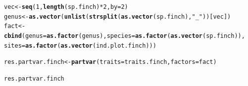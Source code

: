 \documentclass[12pt]{article}\usepackage[]{graphicx}\usepackage[]{color}
\makeatletter
\newcommand{\hlnum}[1]{\textcolor[rgb]{0.686,0.059,0.569}{#1}}%
\newcommand{\hlstr}[1]{\textcolor[rgb]{0.192,0.494,0.8}{#1}}%
\newcommand{\hlopt}[1]{\textcolor[rgb]{0,0,0}{#1}}%
\newcommand{\hlstd}[1]{\textcolor[rgb]{0.345,0.345,0.345}{#1}}%
\newcommand{\hlkwb}[1]{\textcolor[rgb]{0.69,0.353,0.396}{#1}}%
\newcommand{\hlkwc}[1]{\textcolor[rgb]{0.333,0.667,0.333}{#1}}%
\newcommand{\hlkwd}[1]{\textcolor[rgb]{0.737,0.353,0.396}{\textbf{#1}}}%
\newenvironment{kframe}{%
 \def\at@end@of@kframe{}%
 \ifinner\ifhmode%
  \def\at@end@of@kframe{\end{minipage}}%
  \begin{minipage}{\columnwidth}%
 \fi\fi%
 \def\FrameCommand##1{\hskip\@totalleftmargin \hskip-\fboxsep
 \colorbox{shadecolor}{##1}\hskip-\fboxsep
     \hskip-\linewidth \hskip-\@totalleftmargin \hskip\columnwidth}%
 \MakeFramed {\advance\hsize-\width
   \@totalleftmargin\z@ \linewidth\hsize
   \@setminipage}}%
 {\par\unskip\endMakeFramed%
 \at@end@of@kframe}
\newenvironment{knitrout}{}{} %
\makeatother
\begin{document}
\begin{knitrout}
\color{fgcolor}\begin{kframe}
\begin{alltt}
\hlstd{vec} \hlkwb{<-} \hlkwd{seq}\hlstd{(}\hlnum{1}\hlstd{,} \hlkwd{length}\hlstd{(sp.finch)} \hlopt{*} \hlnum{2}\hlstd{,} \hlkwc{by} \hlstd{=} \hlnum{2}\hlstd{)}
\hlstd{genus} \hlkwb{<-} \hlkwd{as.vector}\hlstd{(}\hlkwd{unlist}\hlstd{(}\hlkwd{strsplit}\hlstd{(}\hlkwd{as.vector}\hlstd{(sp.finch),} \hlstr{"_"}\hlstd{))[vec])}
\hlstd{fact} \hlkwb{<-} \hlkwd{cbind}\hlstd{(}\hlkwc{genus} \hlstd{=} \hlkwd{as.factor}\hlstd{(genus),} \hlkwc{species} \hlstd{=} \hlkwd{as.factor}\hlstd{(}\hlkwd{as.vector}\hlstd{(sp.finch)),}
    \hlkwc{sites} \hlstd{=} \hlkwd{as.factor}\hlstd{(}\hlkwd{as.vector}\hlstd{(ind.plot.finch)))}

\hlstd{res.partvar.finch} \hlkwb{<-} \hlkwd{partvar}\hlstd{(}\hlkwc{traits} \hlstd{= traits.finch,} \hlkwc{factors} \hlstd{= fact)}

\hlstd{res.partvar.finch}
\end{alltt}
\end{kframe}
\end{knitrout}
\end{document}
